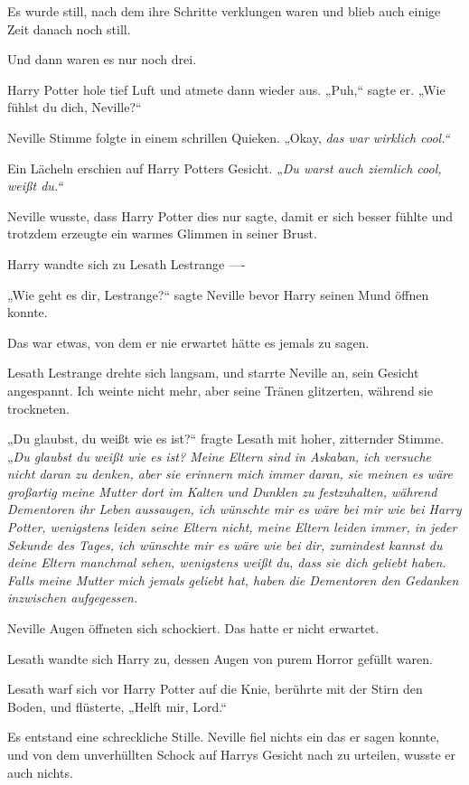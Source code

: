 {Es wurde still, nach dem ihre Schritte verklungen waren und blieb auch einige Zeit danach noch still.

Und dann waren es nur noch drei.

Harry Potter hole tief Luft und atmete dann wieder aus. „Puh,“ sagte er. „Wie fühlst du dich, Neville?“

Neville Stimme folgte in einem schrillen Quieken. „Okay, \emph{das war wirklich cool.“}

Ein Lächeln erschien auf Harry Potters Gesicht. „\emph{Du warst auch ziemlich cool, weißt du.“}

Neville wusste, dass Harry Potter dies nur sagte, damit er sich besser fühlte und trotzdem erzeugte ein warmes Glimmen in seiner Brust.

Harry wandte sich zu Lesath Lestrange ----

„Wie geht es dir, Lestrange?“ sagte Neville bevor Harry seinen Mund öffnen konnte.

Das war etwas, von dem er nie erwartet hätte es jemals zu sagen.

Lesath Lestrange drehte sich langsam, und starrte Neville an, sein Gesicht angespannt. Ich weinte nicht mehr, aber seine Tränen glitzerten, während sie trockneten.

„Du glaubst, du weißt wie es ist?“ fragte Lesath mit hoher, zitternder Stimme. „\emph{Du glaubst du weißt wie es ist? Meine Eltern sind in \emph{Askaban}, ich versuche nicht daran zu denken, aber sie erinnern mich immer daran, sie meinen es wäre großartig meine Mutter dort im Kalten und Dunklen zu festzuhalten, während Dementoren ihr Leben aussaugen, ich wünschte mir es wäre bei mir wie bei Harry Potter, wenigstens leiden seine Eltern nicht, meine Eltern leiden immer, in jeder Sekunde des Tages, ich wünschte mir es wäre wie bei dir, zumindest kannst du deine Eltern manchmal sehen, wenigstens weißt du, dass sie dich geliebt haben. Falls meine Mutter mich jemals geliebt hat, haben die Dementoren den Gedanken inzwischen aufgegessen.}

Neville Augen öffneten sich schockiert. Das hatte er nicht erwartet.

Lesath wandte sich Harry zu, dessen Augen von purem Horror gefüllt waren.

Lesath warf sich vor Harry Potter auf die Knie, berührte mit der Stirn den Boden, und flüsterte, „Helft mir, Lord.“

Es entstand eine schreckliche Stille. Neville fiel nichts ein das er sagen konnte, und von dem unverhüllten Schock auf Harrys Gesicht nach zu urteilen, wusste er auch nichts.

}
